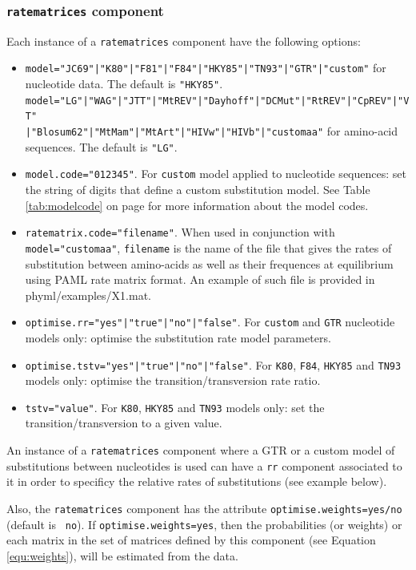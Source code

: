 \documentclass[a4paper,12pt]{article}
\newcommand{\x}[1]{\texttt{#1}}
\begin{document}
\subsubsection{{\tt ratematrices} component}\label{sec:xmlratematrices}
Each instance of a \x{ratematrices} component have the following options:
\begin{itemize}
\item \x{model="JC69"|"K80"|"F81"|"F84"|"HKY85"|"TN93"|"GTR"|"custom"} for nucleotide data. The default is \x{"HKY85"}.\\
\x{model="LG"|"WAG"|"JTT"|"MtREV"|"Dayhoff"|"DCMut"|"RtREV"|"CpREV"|"VT"}\\\x{|"Blosum62"|"MtMam"|"MtArt"|"HIVw"|"HIVb"|"customaa"}
for amino-acid sequences. The default is \x{"LG"}.
\item \x{model.code="012345"}. For \x{custom} model applied to nucleotide sequences: set the
  string of digits that define a custom substitution model. See Table \ref{tab:modelcode} on page
  \pageref{tab:modelcode} for more
  information about the model codes.
\item \x{ratematrix.code="filename"}. When used in conjunction with \x{model="customaa"},
  \x{filename} is the name of the file that gives the rates of substitution between amino-acids as
  well as their frequences at equilibrium using PAML rate matrix format. An example of such file is
  provided in {phyml/examples/X1.mat}.
\item \x{optimise.rr="yes"|"true"|"no"|"false"}. For \x{custom} and \x{GTR} nucleotide models only:
  optimise the substitution rate model parameters.
\item \x{optimise.tstv="yes"|"true"|"no"|"false"}. For \x{K80}, \x{F84}, \x{HKY85} and \x{TN93}
  models only: optimise the transition/transversion rate ratio.
\item \x{tstv="value"}. For \x{K80}, \x{HKY85} and \x{TN93} models only: set the transition/transversion to a
  given value.
\end{itemize}

An instance of a \x{ratematrices} component where a GTR or a custom model of substitutions between
nucleotides is used can have a \x{rr} component associated to it in order to specificy the relative
rates of substitutions (see example below). 

Also, the {\tt ratematrices} component has the attribute {\tt optimise.weights=yes/no} (default is {\tt
  no}). If {\tt optimise.weights=yes}, then the probabilities (or weights) or each matrix in the
set of matrices defined by this component (see Equation \ref{equ:weights}), will be estimated from the data.
\end{document}
